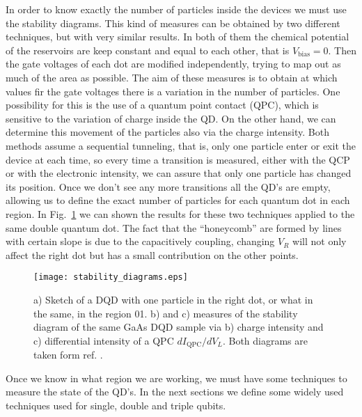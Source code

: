 In order to know exactly the number of particles inside the devices we must use the stability diagrams. This kind of measures can be obtained by two different techniques, but with very similar results. In both of them the chemical potential of the reservoirs are keep constant and equal to each other, that is $V_{\text{bias}}=0$. Then the gate voltages of each dot are modified independently, trying to map out as much of the area as possible. The aim of these measures is to obtain at which values fir the gate voltages there is a variation in the number of particles. One possibility for this is the use of a quantum point contact (QPC), which is sensitive to the variation of charge inside the QD. On the other hand, we can determine this movement of the particles also via the charge intensity. Both methods assume a sequential tunneling, that is, only one particle enter or exit the device at each time, so every time a transition is measured, either with the QCP or with the electronic intensity, we can assure that only one particle has changed its position. Once we don't see any more transitions all the QD's are empty, allowing us to define the exact number of particles for each quantum dot in each region. In Fig.~\ref{fig:stability_diagrams} we can shown the results for these two techniques applied to the same double quantum dot. The fact that the ``honeycomb'' are formed by lines with certain slope is due to the capacitively coupling, changing $V_R$ will not only affect the right dot but has a small contribution on the other points.
\begin{figure}[!htb]
	\centering
	\texttt{[image: stability\_diagrams.eps]}
	\caption{a) Sketch of a DQD with one particle in the right dot, or what in the same, in the region 01. b) and c) measures of the stability diagram of the same GaAs DQD sample via b) charge intensity and c) differential intensity of a QPC $dI_{\text{QPC}}/dV_L$. Both diagrams are taken form ref. \cite{Elzerman2003}.}
	\label{fig:stability_diagrams}
\end{figure}

Once we know in what region we are working, we must have some techniques to measure the state of the QD's. In the next sections we define some widely used techniques used for single, double and triple qubits.

